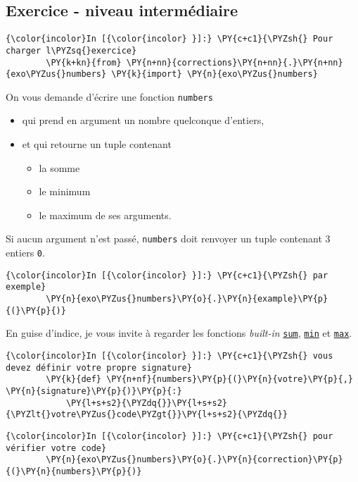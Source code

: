     \hypertarget{exercice---niveau-intermuxe9diaire}{%
\subsection{Exercice - niveau
intermédiaire}\label{exercice---niveau-intermuxe9diaire}}

    \begin{Verbatim}[commandchars=\\\{\}]
{\color{incolor}In [{\color{incolor} }]:} \PY{c+c1}{\PYZsh{} Pour charger l\PYZsq{}exercice}
        \PY{k+kn}{from} \PY{n+nn}{corrections}\PY{n+nn}{.}\PY{n+nn}{exo\PYZus{}numbers} \PY{k}{import} \PY{n}{exo\PYZus{}numbers}
\end{Verbatim}


    On vous demande d'écrire une fonction \texttt{numbers}
    
\begin{itemize}
	\item 
	qui prend en argument un nombre quelconque d'entiers,
	\item
	et qui retourne un tuple contenant
	\begin{itemize}
		\item 
		la somme
		\item
		le minimum
		\item
		le maximum de ses arguments.
	\end{itemize}
\end{itemize}

    Si aucun argument n'est passé, \texttt{numbers} doit renvoyer un tuple
contenant 3 entiers \texttt{0}.

    \begin{Verbatim}[commandchars=\\\{\}]
{\color{incolor}In [{\color{incolor} }]:} \PY{c+c1}{\PYZsh{} par exemple}
        \PY{n}{exo\PYZus{}numbers}\PY{o}{.}\PY{n}{example}\PY{p}{(}\PY{p}{)}
\end{Verbatim}


    En guise d'indice, je vous invite à regarder les fonctions
\emph{built-in}
\href{https://docs.python.org/3/library/functions.html\#sum}{\texttt{sum}},
\href{https://docs.python.org/3/library/functions.html\#min}{\texttt{min}}
et
\href{https://docs.python.org/3/library/functions.html\#max}{\texttt{max}}.

    \begin{Verbatim}[commandchars=\\\{\}]
{\color{incolor}In [{\color{incolor} }]:} \PY{c+c1}{\PYZsh{} vous devez définir votre propre signature}
        \PY{k}{def} \PY{n+nf}{numbers}\PY{p}{(}\PY{n}{votre}\PY{p}{,} \PY{n}{signature}\PY{p}{)}\PY{p}{:}
            \PY{l+s+s2}{\PYZdq{}}\PY{l+s+s2}{\PYZlt{}votre\PYZus{}code\PYZgt{}}\PY{l+s+s2}{\PYZdq{}}
\end{Verbatim}


    \begin{Verbatim}[commandchars=\\\{\}]
{\color{incolor}In [{\color{incolor} }]:} \PY{c+c1}{\PYZsh{} pour vérifier votre code}
        \PY{n}{exo\PYZus{}numbers}\PY{o}{.}\PY{n}{correction}\PY{p}{(}\PY{n}{numbers}\PY{p}{)}
\end{Verbatim}